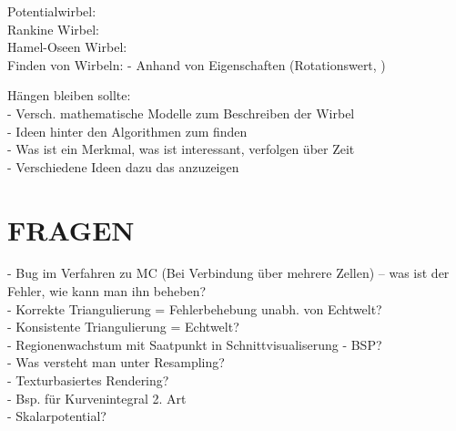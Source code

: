 \documentclass{article}
\begin{document}
Potentialwirbel:\\
Rankine Wirbel:\\
Hamel-Oseen Wirbel:\\

Finden von Wirbeln:
- Anhand von Eigenschaften (Rotationswert,  ) 


Hängen bleiben sollte:\\
- Versch. mathematische Modelle zum Beschreiben der Wirbel\\
- Ideen hinter den Algorithmen zum finden \\
- Was ist ein Merkmal, was ist interessant, verfolgen über Zeit\\
- Verschiedene Ideen dazu das anzuzeigen

\pagebreak
\section{FRAGEN}
- Bug im Verfahren zu MC (Bei Verbindung über mehrere Zellen) -- was ist der Fehler, wie kann man ihn beheben?\\
- Korrekte Triangulierung = Fehlerbehebung unabh. von Echtwelt?\\ 
- Konsistente Triangulierung = Echtwelt?\\
- Regionenwachstum mit Saatpunkt in Schnittvisualiserung - BSP?\\
- Was versteht man unter Resampling?\\
- Texturbasiertes Rendering?\\
- Bsp. für Kurvenintegral 2. Art\\
- Skalarpotential?
\end{document}
